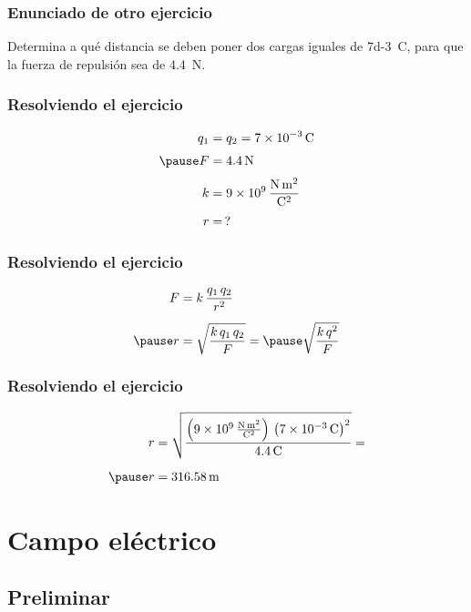 \documentclass[14pt]{beamer}
\begin{document}
\begin{frame}
\frametitle{Enunciado de otro ejercicio}
Determina a qué distancia se deben poner dos cargas iguales de \SI{7d-3}{\coulomb}, para que la fuerza de repulsión sea de \SI{4.4}{\newton}.
\end{frame}
\begin{frame}
\frametitle{Resolviendo el ejercicio}
\pause
\begin{eqnarray*}
\begin{aligned}
q_{1} &= q_{2} = \SI{7d-3}{\coulomb} \\[0.3em] \pause
F &= \SI{4.4}{\newton} \\[0.3em]
k &= \SI[per-mode=fraction]{9d9}{\newton\square\meter\per\square\coulomb} \\[0.3em]
r &= \, ?
\end{aligned}
\end{eqnarray*}
\end{frame}
\begin{frame}
\frametitle{Resolviendo el ejercicio}
\pause
\begin{eqnarray*}
\begin{aligned}
F &= k \, \dfrac{q_{1} \, q_{2}}{r^{2}} \\[0.5em] \pause
r &= \sqrt{\dfrac{k \, q_{1} \, q_{2}}{F}} = \pause \sqrt{\dfrac{k \, q^{2}}{F}}
\end{aligned}
\end{eqnarray*}
\end{frame}
\begin{frame}
\frametitle{Resolviendo el ejercicio}
\begin{eqnarray*}
\begin{aligned}
r &= \sqrt{\dfrac{ \left( \SI[per-mode=fraction]{9d9}{\newton\square\meter\per\square\coulomb} \right) \, \left( \SI{7d-3}{\coulomb} \right)^{2}}{\SI{4.4}{\coulomb}}} = \\[0.5em] \pause
r &= \SI{316.58}{\meter}
\end{aligned}
\end{eqnarray*}
\end{frame}    

\section{Campo eléctrico}
\subsection{Preliminar}
\end{document}
